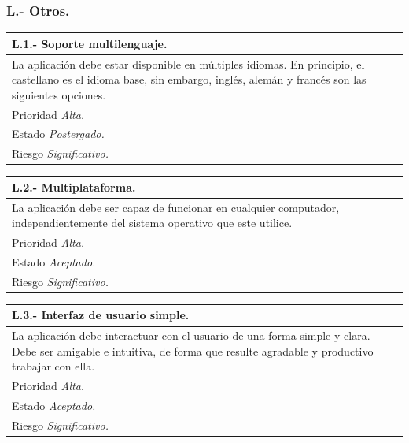 \documentclass[a4paper,oneside,11pt]{book}
\begin{document}
\subsubsection{L.- Otros.}

\begin{center}
\begin{tabulary}{15cm}{|L|}
	\hline
		\bf{L.1.- Soporte multilenguaje.} \\
	\hline
		La aplicación debe estar disponible en múltiples idiomas. En principio, el castellano es el idioma base, sin embargo, inglés, alemán y francés son las siguientes opciones. \\
	\hline
		Prioridad \textit{Alta.} \\
	\hline
		Estado \textit{Postergado.} \\
	\hline
		Riesgo \textit{Significativo.} \\
	\hline
\end{tabulary}
\end{center}

\begin{center}
\begin{tabulary}{15cm}{|L|}
	\hline
		\bf{L.2.- Multiplataforma.} \\
	\hline
		La aplicación debe ser capaz de funcionar en cualquier computador, independientemente del sistema operativo que este utilice. \\
	\hline
		Prioridad \textit{Alta.} \\
	\hline
		Estado \textit{Aceptado.} \\
	\hline
		Riesgo \textit{Significativo.} \\
	\hline
\end{tabulary}
\end{center}

\begin{center}
\begin{tabulary}{15cm}{|L|}
	\hline
		\bf{L.3.- Interfaz de usuario simple.} \\
	\hline
		La aplicación debe interactuar con el usuario de una forma simple y clara. Debe ser amigable e intuitiva, de forma que resulte agradable y productivo trabajar con ella. \\
	\hline
		Prioridad \textit{Alta.} \\
	\hline
		Estado \textit{Aceptado.} \\
	\hline
		Riesgo \textit{Significativo.} \\
	\hline
\end{tabulary}
\end{center}
\end{document}
